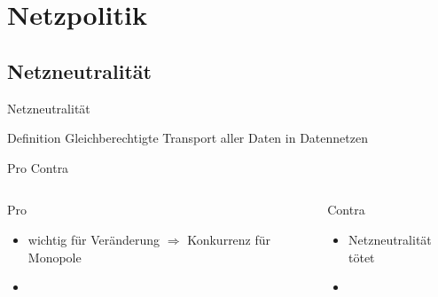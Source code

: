 \documentclass{beamer}
\begin{document}
\section{Netzpolitik}
\subsection{Netzneutralität}
\begin{frame}{Netzneutralität}
\begin{block}{Definition}
	Gleichberechtigte Transport aller Daten in Datennetzen
\end{block}
\end{frame}

\begin{frame}{Pro Contra}
\begin{columns}[t]
    \begin{column}{.5\textwidth}      	
      	\begin{block}{Pro}
		\begin{itemize}
			\item wichtig für Veränderung \(\Rightarrow\) Konkurrenz für Monopole
			\item {}
		\end{itemize}
		\end{block}
    \end{column}
	\begin{column}{.5\textwidth}
		\uncover<2> {
		\begin{block}{Contra}
       	\begin{itemize}
			\item Netzneutralität tötet
			\item {}
       	\end{itemize}
		\end{block}
		}
	\end{column}
\end{columns}
\end{frame}
\end{document}
